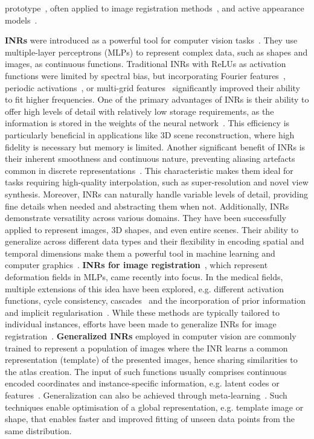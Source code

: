 prototype~\cite{bone2020learning,niethammer2011geometric},  often applied to image registration methods~\cite{meng2022enhancing}, and active appearance models~\cite{cootes2001active}. 

\noindent \textbf{INRs} were introduced as a powerful tool for computer vision tasks~\cite{sitzmann2019siren}. They use multiple-layer perceptrons (MLPs) to represent complex data, such as shapes and images, as continuous functions. Traditional INRs with ReLUs as activation functions were limited by spectral bias, but incorporating Fourier features~\cite{tancik2020fourier}, periodic activations~\cite{sitzmann2019siren}, or multi-grid features~\cite{muller2022instant} significantly improved their ability to fit higher frequencies.
One of the primary advantages of INRs is their ability to offer high levels of detail with relatively low storage requirements, as the information is stored in the weights of the neural network~\cite{park2019deepsdf}. This efficiency is particularly beneficial in applications like 3D scene reconstruction, where high fidelity is necessary but memory is limited. Another significant benefit of INRs is their inherent smoothness and continuous nature, preventing aliasing artefacts common in discrete representations~\cite{mildenhall2021nerf}. This characteristic makes them ideal for tasks requiring high-quality interpolation, such as super-resolution and novel view synthesis.
Moreover, INRs can naturally handle variable levels of detail, providing fine details when needed and abstracting them when not. Additionally, INRs demonstrate versatility across various domains. They have been successfully applied to represent images, 3D shapes, and even entire scenes. Their ability to generalize across different data types and their flexibility in encoding spatial and temporal dimensions make them a powerful tool in machine learning and computer graphics~\cite{tancik2020fourier}. \textbf{INRs for image registration}~\cite{pmlr-v172-wolterink22a}, which represent deformation fields in MLPs, came recently into focus. In the medical fields, multiple extensions of this idea have been explored, e.g. different activation functions, cycle consistency, cascades~ and the incorporation of prior information and implicit regularisation~\cite{byra2023exploring,van2024deformable,sideri2024sinr}.
While these methods are typically tailored to individual instances, efforts have been made to generalize INRs for image registration~\cite{zimmer2023towards}. \textbf{Generalized INRs} employed in computer vision are commonly trained to represent a population of images where the INR learns a common representation (template) of the presented images, hence sharing similarities to the atlas creation. The input of such functions usually comprises continuous encoded coordinates and instance-specific information, e.g. latent codes or features~\cite{park2019deepsdf,stolt2023nisf}. Generalization can also be achieved through meta-learning~\cite{chen2022transformers,liu2022nutracker}. Such techniques enable optimisation of a global representation, e.g. template image or shape, that enables faster and improved fitting of unseen data points from the same distribution. 

